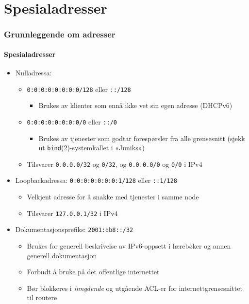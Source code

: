 \section{Spesialadresser}
\begin{frame}%
  \frametitle{Grunnleggende om adresser}
  \framesubtitle{Spesialadresser}
  \pause
  \begin{itemize}[<+->]
  \item Nulladressa:
    \begin{itemize}[<+->]
    \item \texttt{0:0:0:0:0:0:0:0/128} eller \texttt{::/128}
      \begin{itemize}[<+->]
      \item Brukes av klienter som ennå ikke vet sin egen adresse
        (DHCPv6)
      \end{itemize}
    \item \texttt{0:0:0:0:0:0:0:0/0} eller \texttt{::/0}
      \begin{itemize}[<+->]
      \item Brukes av tjenester som godtar forespørsler fra alle
        grensesnitt (sjekk ut
        \href{http://www.freebsd.org/cgi/man.cgi?query=bind&apropos=0&sektion=2&manpath=FreeBSD+9.1-RELEASE&arch=default&format=html}{\texttt{bind}(2)}-systemkallet
        i «Juniks»)
      \end{itemize}
    \item Tilsvarer \texttt{0.0.0.0/32} og \texttt{0/32}, og \texttt{0.0.0.0/0} og \texttt{0/0} i IPv4
    \end{itemize}
  \item Loopbackadressa: \texttt{0:0:0:0:0:0:0:1/128} eller
    \texttt{::1/128}
    \begin{itemize}[<+->]
    \item Velkjent adresse for å snakke med tjenester i samme node
    \item Tilsvarer \texttt{127.0.0.1/32} i IPv4
    \end{itemize}
  \item Dokumentasjonsprefiks: \texttt{2001:db8::/32}
    \begin{itemize}[<+->]
    \item Brukes for generell beskrivelse av IPv6-oppsett i lærebøker
      og annen generell dokumentasjon 
    \item Forbudt å bruke på det offentlige internettet
    \item Bør blokkeres i \textit{inngående\/} og utgående ACL-er for
      internettgrensesnittet til routere
    \end{itemize}
  \end{itemize}
\end{frame}

